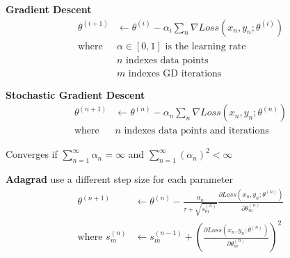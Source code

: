 \documentclass[]{article}
\theoremstyle{definition}
\begin{document}
\textbf{Gradient Descent}
\begin{align*}
    \theta^{(i+1)} & \gets \theta^{(i)} - \alpha_i \sum_n \nabla Loss(x_n, y_n; \theta^{(i)}) \\
    \text{where } & \alpha \in [0,1] \text{ is the learning rate} \\
    &n \text{ indexes data points} \\
    &m \text{ indexes GD iterations}
\end{align*}

\textbf{Stochastic Gradient Descent}
\begin{align*}
    \theta^{(n+1)} & \gets \theta^{(n)} - \alpha_n \sum_n \nabla Loss(x_n, y_n; \theta^{(n)}) \\
    \text{where } & n \text{ indexes data points and iterations}
\end{align*}

Converges if $\sum_{n=1}^\infty \alpha_n = \infty$ and $\sum_{n=1}^\infty (\alpha_n)^2 < \infty$

\bigskip

\textbf{Adagrad} use a different step size for each parameter
\begin{align*}
    \theta^{(n+1)} & \gets \theta^{(n)} - \frac{\alpha_n}{\tau + \sqrt{s_m^{(n)}}} \frac{\partial Loss(x_n, y_n; \theta^{(n)})}{\partial \theta_m^{(n)}} \\
    \text{where } s_m^{(n)} & \gets s_m^{(n-1)} +  \left(\frac{\partial Loss(x_n, y_n; \theta^{(n)})}{\partial \theta_m^{(n)}}\right)^2 \\
\end{align*}
\end{document}
